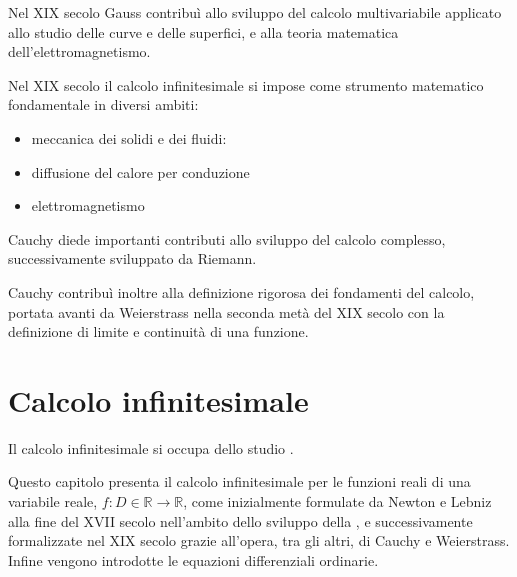 \documentclass[letterpaper,10pt,italian]{jupyterBook}
\begin{document}
\sphinxAtStartPar
Nel XIX secolo Gauss contribuì allo sviluppo del calcolo multivariabile applicato allo studio delle curve e delle superfici, e alla teoria matematica dell’elettromagnetismo.

\sphinxAtStartPar
Nel XIX secolo il calcolo infinitesimale si impose come strumento matematico fondamentale in diversi ambiti:
\begin{itemize}
\item {} 
\sphinxAtStartPar
meccanica dei solidi e dei fluidi:

\item {} 
\sphinxAtStartPar
diffusione del calore per conduzione

\item {} 
\sphinxAtStartPar
elettromagnetismo

\end{itemize}

\sphinxAtStartPar
Cauchy diede importanti contributi allo sviluppo del calcolo complesso, successivamente sviluppato da Riemann.

\sphinxAtStartPar
Cauchy contribuì inoltre alla definizione rigorosa dei fondamenti del calcolo, portata avanti da Weierstrass nella seconda metà del XIX secolo con la definizione di limite e continuità di una funzione.



\sphinxstepscope


\chapter{Calcolo infinitesimale}
\label{\detokenize{ch/infinitesimal_calculus:calcolo-infinitesimale}}\label{\detokenize{ch/infinitesimal_calculus:infinitesimal-calculus}}\label{\detokenize{ch/infinitesimal_calculus::doc}}
\sphinxAtStartPar
Il calcolo infinitesimale si occupa dello studio  .

\sphinxAtStartPar
Questo capitolo presenta il calcolo infinitesimale per le funzioni reali di una variabile reale, \(f: D \in \mathbb{R} \rightarrow \mathbb{R}\), come inizialmente formulate da Newton e Lebniz alla fine del XVII secolo nell’ambito dello sviluppo della , e successivamente formalizzate nel XIX secolo grazie all’opera, tra gli altri, di Cauchy e Weierstrass. Infine vengono introdotte le equazioni differenziali ordinarie.  
\end{document}
